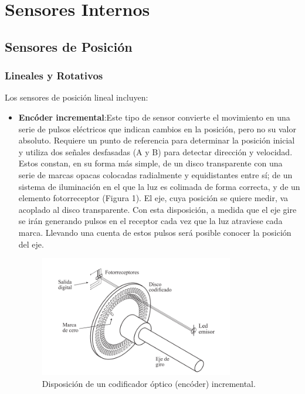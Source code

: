 \section{Sensores Internos}
	\subsection{Sensores de Posición}
\subsubsection{Lineales y Rotativos}
Los sensores de posición lineal incluyen:

\begin{itemize}
	\item \textbf{Encóder incremental}:Este tipo de sensor convierte el movimiento en una serie de pulsos eléctricos que indican cambios en la posición, pero no su valor absoluto. Requiere un punto de referencia para determinar la posición inicial y utiliza dos señales desfasadas (A y B) para detectar dirección y velocidad. Estos constan, en su forma más simple, de un
	disco transparente con una serie de marcas opacas colocadas radialmente y equidistantes entre sí; de un sistema de iluminación en el que la luz es colimada de forma correcta, y de un elemento fotorreceptor (Figura 1). El eje, cuya posición se quiere medir, va acoplado al disco transparente. Con esta disposición, a medida que el eje gire se irán generando pulsos en el receptor cada vez que la luz atraviese cada marca. Llevando una cuenta de estos pulsos será posible conocer la posición del eje.
	\begin{figure}[h]
		\centering
		\includegraphics[width=0.8\textwidth]{img/encoderincremental.png}
		\caption{Disposición de un codificador óptico (encóder) incremental.}
		\label{fig:encoderincremental}
	\end{figure}
	

\end{itemize}
